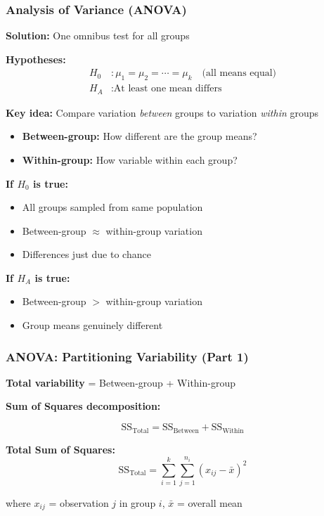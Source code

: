 \documentclass{beamer}
\begin{document}
\begin{frame}
\frametitle{Analysis of Variance (ANOVA)}
\textbf{Solution:} One omnibus test for all groups

\vspace{0.1cm}
\textbf{Hypotheses:}
\begin{align*}
H_0&: \mu_1 = \mu_2 = \cdots = \mu_k \quad \text{(all means equal)}\\
H_A&: \text{At least one mean differs}
\end{align*}

\vspace{0.1cm}
\textbf{Key idea:} Compare variation \textit{between} groups to variation \textit{within} groups

\vspace{0.1cm}
\begin{itemize}
\setlength\itemsep{-0.3em}
\item \textbf{Between-group:} How different are the group means?
\item \textbf{Within-group:} How variable within each group?
\end{itemize}

\vspace{0.1cm}
\textbf{If $H_0$ is true:}
\begin{itemize}
\setlength\itemsep{-0.3em}
\item All groups sampled from same population
\item Between-group $\approx$ within-group variation
\item Differences just due to chance
\end{itemize}

\textbf{If $H_A$ is true:}
\begin{itemize}
\setlength\itemsep{-0.3em}
\item Between-group $>$ within-group variation
\item Group means genuinely different
\end{itemize}
\end{frame}

\begin{frame}
\frametitle{ANOVA: Partitioning Variability (Part 1)}
\textbf{Total variability} = Between-group + Within-group

\vspace{0.3cm}
\textbf{Sum of Squares decomposition:}

$$\text{SS}_{\text{Total}} = \text{SS}_{\text{Between}} + \text{SS}_{\text{Within}}$$

\vspace{0.3cm}
\textbf{Total Sum of Squares:}
$$\text{SS}_{\text{Total}} = \sum_{i=1}^{k}\sum_{j=1}^{n_i} (x_{ij} - \bar{x})^2$$

where $x_{ij}$ = observation $j$ in group $i$, $\bar{x}$ = overall mean
\end{frame}
\end{document}
